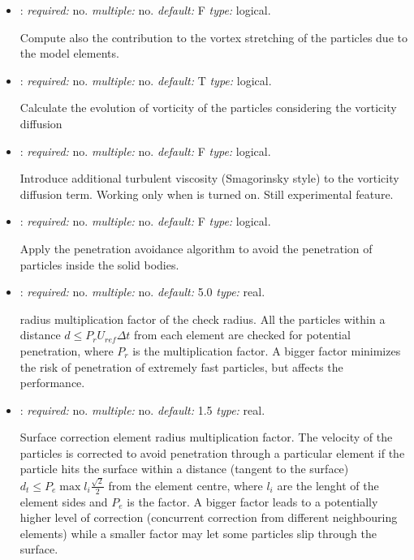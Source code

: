 \begin{itemize}
\item {}: \textit{required:} no. \textit{multiple:} no. \textit{default:} F \textit{type:} logical.

Compute also the contribution to the vortex stretching of the particles due to the model elements. 

\item {}: \textit{required:} no. \textit{multiple:} no. \textit{default:} T \textit{type:} logical.

Calculate the evolution of vorticity of the particles considering the vorticity diffusion

\item {}: \textit{required:} no. \textit{multiple:} no. \textit{default:} F \textit{type:} logical.

Introduce additional turbulent viscosity (Smagorinsky style) to the vorticity diffusion term. Working only when  is turned on. Still experimental feature. 

\item {}: \textit{required:} no. \textit{multiple:} no. \textit{default:} F \textit{type:} logical.

Apply the penetration avoidance algorithm to avoid the penetration of particles inside the solid bodies.

\item {}: \textit{required:} no. \textit{multiple:} no. \textit{default:} 5.0 \textit{type:} real.

radius multiplication factor of the check radius. All the particles within a distance $d\leq P_r U_{ref} \Delta t$ from each element are checked for potential penetration, where $P_r$ is the multiplication factor. A bigger factor minimizes the risk of penetration of extremely fast particles, but affects the performance. 

\item {}: \textit{required:} no. \textit{multiple:} no. \textit{default:} 1.5 \textit{type:} real.

Surface correction element radius multiplication factor.
The velocity of the particles is corrected to avoid penetration through a particular element if the particle hits the surface within a distance (tangent to the surface) $d_t \leq P_e \max{l_i} \frac{\sqrt{2}}{2}$ from the element centre, where $l_i$ are the lenght of the element sides and $P_e$ is the factor. 
A bigger factor leads to a potentially higher level of correction (concurrent correction from different neighbouring elements) while a smaller factor may let some particles slip through the surface. 


\end{itemize}
